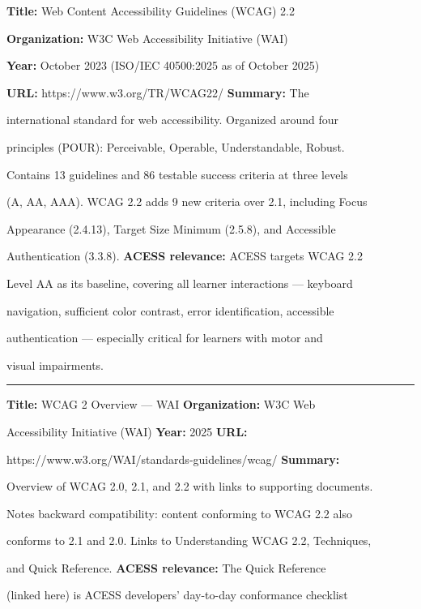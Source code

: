 \documentclass[12pt, oneside]{article} %
\begin{document}
\textbf{Title:} Web Content Accessibility Guidelines (WCAG) 2.2

\textbf{Organization:} W3C Web Accessibility Initiative (WAI)

\textbf{Year:} October 2023 (ISO/IEC 40500:2025 as of October 2025)

\textbf{URL:} https://www.w3.org/TR/WCAG22/ \textbf{Summary:} The

international standard for web accessibility. Organized around four

principles (POUR): Perceivable, Operable, Understandable, Robust.

Contains 13 guidelines and 86 testable success criteria at three levels

(A, AA, AAA). WCAG 2.2 adds 9 new criteria over 2.1, including Focus

Appearance (2.4.13), Target Size Minimum (2.5.8), and Accessible

Authentication (3.3.8). \textbf{ACESS relevance:} ACESS targets WCAG 2.2

Level AA as its baseline, covering all learner interactions --- keyboard

navigation, sufficient color contrast, error identification, accessible

authentication --- especially critical for learners with motor and

visual impairments.



\begin{center}\rule{0.5\linewidth}{0.5pt}\end{center}



\textbf{Title:} WCAG 2 Overview --- WAI \textbf{Organization:} W3C Web

Accessibility Initiative (WAI) \textbf{Year:} 2025 \textbf{URL:}

https://www.w3.org/WAI/standards-guidelines/wcag/ \textbf{Summary:}

Overview of WCAG 2.0, 2.1, and 2.2 with links to supporting documents.

Notes backward compatibility: content conforming to WCAG 2.2 also

conforms to 2.1 and 2.0. Links to Understanding WCAG 2.2, Techniques,

and Quick Reference. \textbf{ACESS relevance:} The Quick Reference

(linked here) is ACESS developers' day-to-day conformance checklist
\end{document}
